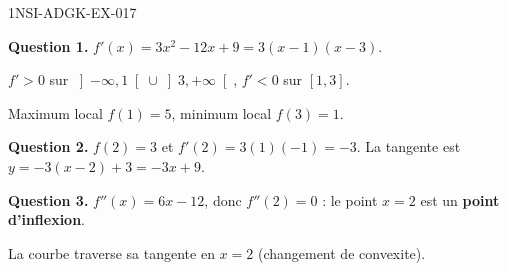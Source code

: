 \begin{corrige}{1NSI-ADGK-EX-017}

\textbf{Question 1.} $f'(x) = 3x^2 - 12x + 9 = 3(x-1)(x-3)$.


$f' > 0$ sur $\left]-\infty,1\right[ \cup \left]3,+\infty\right[$, $f' < 0$ sur $[1,3]$.

Maximum local $f(1) = 5$, minimum local $f(3) = 1$.

\textbf{Question 2.} $f(2) = 3$ et $f'(2) = 3(1)(-1) = -3$. La tangente est $y = -3(x-2)+3 = -3x+9$.

\textbf{Question 3.} $f''(x) = 6x - 12$, donc $f''(2) = 0$ : le point $x=2$ est un \textbf{point d'inflexion}.

La courbe traverse sa tangente en $x = 2$ (changement de convexite).

\end{corrige}
